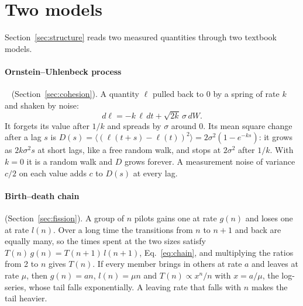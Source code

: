 \section{Two models}\label{app:models}

Section~\ref{sec:structure} reads two measured quantities through two textbook models.

\paragraph{Ornstein--Uhlenbeck process}~\cite{uhlenbeck1930} (Section~\ref{sec:cohesion}). A quantity
$\ell$ pulled back to 0 by a spring of rate $k$ and shaken by noise:
\begin{equation}
  d\ell=-k\,\ell\,dt+\sqrt{2k}\,\sigma\,dW .
\end{equation}
It forgets its value after $1/k$ and spreads by $\sigma$ around 0. Its mean square change after a
lag $s$ is $D(s)=\langle(\ell(t+s)-\ell(t))^2\rangle=2\sigma^2(1-e^{-ks})$: it grows as
$2k\sigma^2 s$ at short lags, like a free random walk, and stops at $2\sigma^2$ after $1/k$. With
$k=0$ it is a random walk and $D$ grows forever. A measurement noise of variance $c/2$ on each
value adds $c$ to $D(s)$ at every lag.

\paragraph{Birth--death chain} (Section~\ref{sec:fission}). A group of $n$ pilots gains one at rate
$g(n)$ and loses one at rate $l(n)$. Over a long time the transitions from $n$ to $n+1$ and back are
equally many, so the times spent at the two sizes satisfy $T(n)\,g(n)=T(n+1)\,l(n+1)$,
Eq.~\eqref{eq:chain}, and multiplying the ratios from 2 to $n$ gives $T(n)$. If every member brings
in others at rate $a$ and leaves at rate $\mu$, then $g(n)=an$, $l(n)=\mu n$ and $T(n)\propto
x^n/n$ with $x=a/\mu$, the log-series, whose tail falls exponentially. A leaving rate that falls
with $n$ makes the tail heavier.
